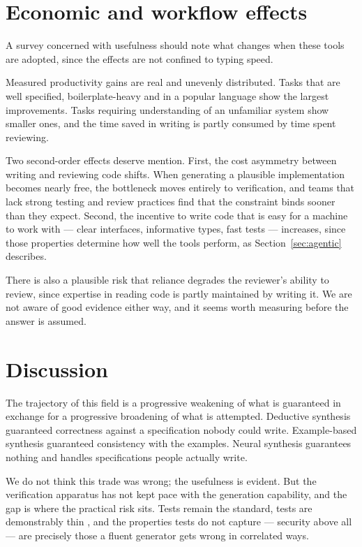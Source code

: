\documentclass[11pt,a4paper]{article}
\begin{document}
\section{Economic and workflow effects}
\label{sec:workflow}

A survey concerned with usefulness should note what changes when these tools
are adopted, since the effects are not confined to typing speed.

Measured productivity gains are real and unevenly distributed. Tasks that are
well specified, boilerplate-heavy and in a popular language show the largest
improvements. Tasks requiring understanding of an unfamiliar system show
smaller ones, and the time saved in writing is partly consumed by time spent
reviewing.

Two second-order effects deserve mention. First, the cost asymmetry between
writing and reviewing code shifts. When generating a plausible implementation
becomes nearly free, the bottleneck moves entirely to verification, and teams
that lack strong testing and review practices find that the constraint binds
sooner than they expect. Second, the incentive to write code that is easy for
a machine to work with --- clear interfaces, informative types, fast tests ---
increases, since those properties determine how well the tools perform, as
Section~\ref{sec:agentic} describes.

There is also a plausible risk that reliance degrades the reviewer's ability
to review, since expertise in reading code is partly maintained by writing it.
We are not aware of good evidence either way, and it seems worth measuring
before the answer is assumed.

\section{Discussion}
\label{sec:discussion}

The trajectory of this field is a progressive weakening of what is guaranteed
in exchange for a progressive broadening of what is attempted. Deductive
synthesis guaranteed correctness against a specification nobody could write.
Example-based synthesis guaranteed consistency with the examples. Neural
synthesis guarantees nothing and handles specifications people actually write.

We do not think this trade was wrong; the usefulness is evident. But the
verification apparatus has not kept pace with the generation capability, and
the gap is where the practical risk sits. Tests remain the standard, tests are
demonstrably thin \cite{liu2023}, and the properties tests do not capture ---
security above all --- are precisely those a fluent generator gets wrong in
correlated ways.
\end{document}
